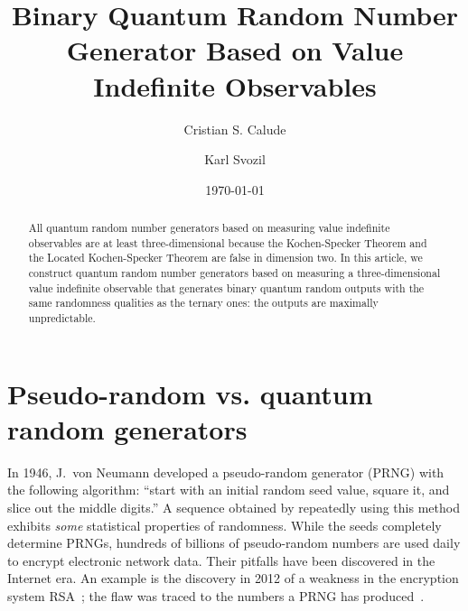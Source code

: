 \documentclass[%
 superscriptaddress,
  preprint,
 showpacs,
 showkeys,
 nofootinbib,
  amsmath,amssymb,
  aps,
 pra,
  longbibliography,
  floatfix,
 ]{revtex4-2}
\theoremstyle{definition}
\begin{document}
\title{Binary Quantum Random Number Generator Based on Value Indefinite
Observables}

\author{Cristian S. Calude}




\author{Karl Svozil}



\date{\today}

\begin{abstract}
All quantum random number generators based on measuring value indefinite observables are at least three-dimensional because the Kochen-Specker Theorem and the Located Kochen-Specker Theorem are false in dimension two. In this article, we construct quantum random number generators based on measuring a three-dimensional value indefinite observable that generates binary quantum random outputs with the same randomness qualities as the ternary ones: the outputs are maximally unpredictable.
\end{abstract}


\maketitle

\newpage



\section{Pseudo-random vs. quantum random generators}

In 1946, J.~von Neumann developed a pseudo-random generator (PRNG) with the following algorithm:
``start with an initial random seed value, square it, and slice out the middle digits.''
A sequence obtained by repeatedly using this method exhibits {\it some} statistical properties of randomness.
While the seeds completely determine PRNGs, hundreds of billions of pseudo-random numbers are used daily to encrypt electronic network data.
Their pitfalls have been discovered in the Internet era.
An example is the discovery in 2012 of a weakness in the encryption system RSA~\cite{prng_flow};
the flaw was traced to the numbers a PRNG has produced~\cite{factor_wrong2012}.
\end{document}
